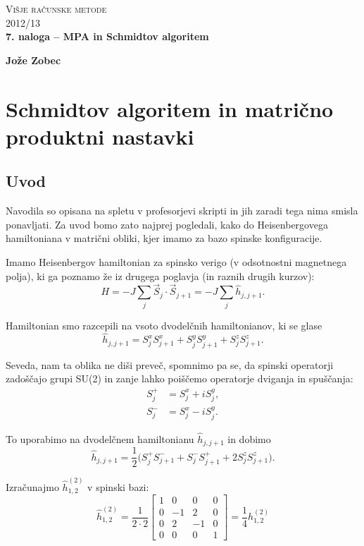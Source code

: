 \documentclass[12pt, a4paper]{article}
\begin{document}
\begin{center}
\textsc{Vi\v sje ra\v cunske metode}\\
\textsc{2012/13}\\[0.5cm]
\textbf{7. naloga -- MPA in Schmidtov algoritem}
\end{center}
\begin{flushright}
\textbf{Jo\v ze Zobec}
\end{flushright}

\section{Schmidtov algoritem in matri\v cno produktni nastavki}

\subsection{Uvod}
Navodila so opisana na spletu v profesorjevi skripti in jih zaradi tega nima smisla ponavljati. Za uvod bomo zato najprej
pogledali, kako do Heisenbergovega hamiltoniana v matri\v cni obliki, kjer imamo za bazo spinske konfiguracije.

Imamo Heisenbergov hamiltonian za spinsko verigo (v odsotnostni magnetnega polja), ki ga poznamo že iz
drugega poglavja (in raznih drugih kurzov):
\[
	H = -J\sum_j \vec{S}_j \cdot \vec{S}_{j+1} = -J \sum_j \hat{h}_{j,j+1}.
\]

Hamiltonian smo razcepili na vsoto dvodelčnih hamiltonianov, ki se glase
\[
	\hat{h}_{j,j+1} = S_j^x S_{j+1}^x + S_j^y S_{j+1}^y + S_j^z S_{j+1}^z.
\]

Seveda, nam ta oblika ne diši preveč, spomnimo pa se, da spinski operatorji zadoščajo
grupi SU(2) in zanje lahko poiščemo operatorje dviganja in spuščanja:
\begin{align*}
	S_j^+ &= S_j^x + iS_j^y,\\
	S_j^- &= S_j^x - iS_j^y.
\end{align*}

To uporabimo na dvodelčnem hamiltonianu $\hat{h}_{j,j+1}$ in dobimo
\[
	\hat{h}_{j,j+1} = \frac{1}{2}\big(S^+_jS^-_{j+1} + S^-_jS^+_{j+1} + 2S^z_jS^z_{j+1}\big).
\]

Izračunajmo $\hat{h}^{(2)}_{1,2}$ v spinski bazi:
\[
	\hat{h}^{(2)}_{1,2} = \frac{1}{2 \cdot 2}\begin{bmatrix}
		1 & 0 & 0 & 0 \\
		0 &-1 & 2 & 0 \\
		0 & 2 & -1& 0 \\
		0 & 0 & 0 & 1
	\end{bmatrix} = \frac{1}{4} h^{(2)}_{1,2}
\]
\end{document}
